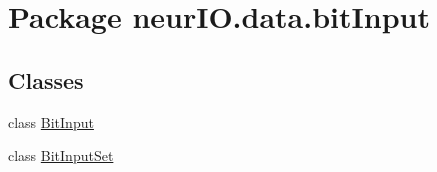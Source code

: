 \hypertarget{namespaceneur_i_o_1_1data_1_1bit_input}{}\section{Package neur\+I\+O.\+data.\+bit\+Input}
\label{namespaceneur_i_o_1_1data_1_1bit_input}
\subsection*{Classes}
\begin{DoxyCompactItemize}
\item 
class \hyperlink{classneur_i_o_1_1data_1_1bit_input_1_1_bit_input}{Bit\+Input}
\item 
class \hyperlink{classneur_i_o_1_1data_1_1bit_input_1_1_bit_input_set}{Bit\+Input\+Set}
\end{DoxyCompactItemize}
